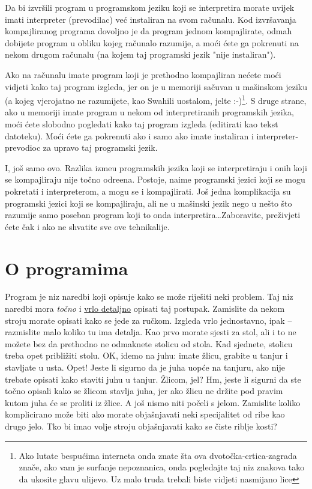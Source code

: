 	Da bi izvr\v{s}ili program u programskom jeziku koji se interpretira morate uvijek
	imati interpreter (prevodilac) ve\'{c} instaliran na svom ra\v{c}unalu. Kod
	izvr\v{s}avanja kompajliranog programa dovoljno je da program jednom kompajlirate,
	odmah dobijete program u obliku kojeg ra\v{c}unalo razumije, a mo\'{c}i \'{c}ete ga
	pokrenuti na nekom drugom ra\v{c}unalu (na kojem taj programski jezik "nije
	instaliran"). 

	Ako na ra\v{c}unalu imate program koji je prethodno kompajliran ne\'{c}ete mo\'{c}i
	vidjeti kako taj program izgleda, jer on je u memoriji sa\v{c}uvan u ma\v{s}inskom
	jeziku (a kojeg vjerojatno ne razumijete, kao Swahili uostalom, jelte 
	:-)\footnote{Ako lutate bespu\'{c}ima interneta onda znate \v{s}ta ova
	dvoto\v{c}ka-crtica-zagrada zna\v{c}e, ako vam je surfanje nepoznanica, onda
	pogledajte taj niz znakova tako da ukosite glavu ulijevo. Uz malo truda trebali
	biste vidjeti nasmijano lice}. 
	S druge
	strane, ako u memoriji imate program u nekom od interpretiranih programskih jezika,
	mo\'{c}i \'{c}ete slobodno pogledati kako taj program izgleda (editirati kao tekst
	datoteku). Mo\'{c}i \'{c}ete ga pokrenuti ako i samo ako imate instaliran i
	interpreter-prevodioc za upravo taj programski jezik.

	I, jo\v{s} samo ovo. Razlika izme\dj{}u programskih jezika koji se interpretiraju
	i onih koji se kompajliraju nije to\v{c}no odre\dj{}ena. Postoje, naime programski
	jezici koji se mogu pokretati i interpreterom, a mogu se i kompajlirati. Jo\v{s}
	jedna komplikacija su programski jezici koji se kompajliraju, ali ne u ma\v{s}inski
	jezik nego u ne\v{s}to \v{s}to razumije samo poseban program koji to onda
	interpretira\dots Zaboravite, pre\v{z}ivjeti \'{c}ete \v{c}ak i ako ne shvatite sve
	ove tehnikalije.

\section{O programima}
	
	Program je niz naredbi koji opisuje kako se mo\v{z}e rije\v{s}iti neki problem. Taj
	niz naredbi mora \emph{to\v{c}no} i \underline{vrlo detaljno} opisati taj
	postupak. Zamislite da nekom stroju morate opisati kako se jede za ru\v{c}kom.
	Izgleda vrlo jednostavno, ipak -- razmislite malo koliko tu ima detalja. Kao prvo
	morate sjesti za stol, ali i to ne mo\v{z}ete bez da prethodno ne odmaknete stolicu
	od stola. Kad sjednete, stolicu treba opet pribli\v{z}iti stolu. OK, idemo na juhu:
	imate \v{z}licu, grabite u tanjur i stavljate u usta. Opet! Jeste li sigurno da je
	juha uop\'{c}e na tanjuru, ako nije trebate opisati kako staviti juhu u tanjur.
	\v{Z}licom, jel? Hm, jeste li sigurni da ste to\v{c}no opisali kako se \v{z}licom
	stavlja juha, jer ako \v{z}licu ne dr\v{z}ite pod pravim kutom juha \'{c}e
	se proliti iz \v{z}lice. A jo\v{s} nismo niti po\v{c}eli s jelom. Zamislite
	koliko komplicirano mo\v{z}e biti ako morate obja\v{s}njavati neki specijalitet od
	ribe kao drugo jelo.
	Tko bi imao volje stroju obja\v{s}njavati kako se
	\v{c}iste riblje kosti?

